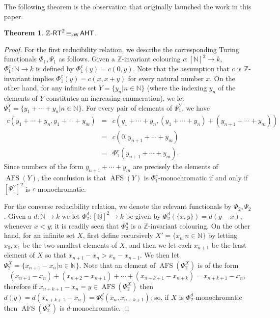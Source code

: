 \documentclass[10pt,a4paper]{amsart}
\newcommand{\zrt}{\mathnormal{\mathbb Z\text{-}\mathsf{RT}}}
\newcommand{\aht}{\mathnormal{\mathsf{AHT}}}
\newcommand{\weiseq}{\mathop{\equiv_{\mathrm{s}\mathsf{W}}}}
\DeclareMathOperator{\afs}{AFS}
\newtheorem{theorem}{Theorem}%
\theoremstyle{definition}
\begin{document}
The following theorem is the observation that originally launched the work in this paper.

\begin{theorem}\label{zrtversusaht}
$\zrt^2\weiseq\aht$.
\end{theorem}

\begin{proof}
For the first reducibility relation, we describe the corresponding Turing functionals $\Phi_1,\Psi_1$ as follows.
Given a $\mathbb Z$-invariant colouring $c:[\mathbb N]^2\longrightarrow k$, $\Phi_1^c:\mathbb N\longrightarrow k$ is defined by $\Phi_1^c(y)=c(0,y)$. Note that the assumption that $c$ is $\mathbb Z$-invariant implies $\Phi_1^c(y)=c(x,x+y)$ for every natural number $x$. On the other hand, for any infinite set $Y=\{y_n\big|n\in\mathbb N\}$ (where the indexing $y_n$ of the elements of $Y$ constitutes an increasing enumeration), we let $\Psi_1^Y=\{y_1+\cdots+y_n\big|n\in\mathbb N\}$. For every pair of elements of $\Psi_1^Y$, we have
\begin{eqnarray*}
c(y_1+\cdots+y_n,y_1+\cdots+y_m) & = & c(y_1+\cdots+y_n,(y_1+\cdots+y_n)+(y_{n+1}+\cdots+y_m)) \\
 & = & c(0,y_{n+1}+\cdots+y_m) \\
 & = & \Phi_1^c(y_{n+1}+\cdots+y_m).
\end{eqnarray*}
Since numbers of the form $y_{n+1}+\cdots+y_m$ are precisely the elements of $\afs(Y)$, the conclusion is that $\afs(Y)$ is $\Phi_1^c$-monochromatic if and only if $[\Psi_1^Y]^2$ is $c$-monochromatic.

For the converse reducibility relation, we denote the relevant functionals by $\Phi_2,\Psi_2$. Given a $d:\mathbb N\longrightarrow k$ we let $\Phi_2^d:[\mathbb N]^2\longrightarrow k$ be given by $\Phi_2^d(\{x,y\})=d(y-x)$, whenever $x<y$; it is readily seen that $\Phi_2^d$ is a $\mathbb Z$-invariant colouring. On the other hand, for an infinite set $X$, first define recursively $X'=\{x_n\big|n\in\mathbb N\}$ by letting $x_0,x_1$ be the two smallest elements of $X$, and then we let each $x_{n+1}$ be the least element of $X$ so that $x_{n+1}-x_n>x_n-x_{n-1}$. We then let $\Psi_2^X=\{x_{n+1}-x_n\big|n\in\mathbb N\}$. Note that an element of $\afs(\Psi_2^X)$ is of the form
\begin{equation*}
(x_{n+1}-x_n)+(x_{n+2}-x_{n+1})+\cdots+(x_{n+k+1}-x_{n+k})=x_{n+k+1}-x_n,
\end{equation*}
therefore if $x_{n+k+1}-x_n=y\in\afs(\Psi_2^X)$ then $d(y)=d(x_{n+k+1}-x_n)=\Phi_2^d(x_n,x_{n+k+1})$; so, if $X$ is $\Phi_2^d$-monochromatic then $\afs(\Psi_2^X)$ is $d$-monochromatic.
\end{proof}
\end{document}
